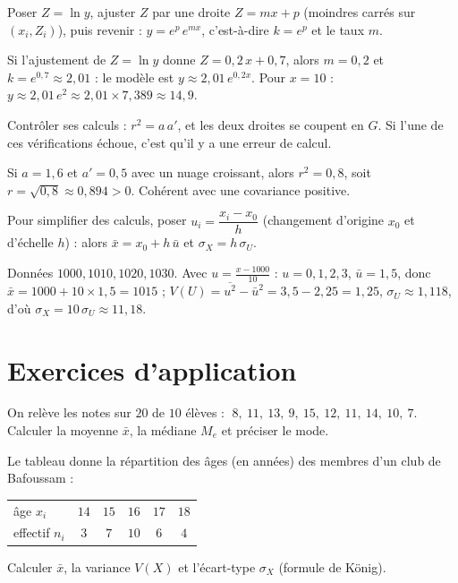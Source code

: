 Poser $Z=\ln y$, ajuster $Z$ par une droite $Z=mx+p$ (moindres carrés sur $(x_i,Z_i)$), puis
revenir : $y=e^{p}\,e^{mx}$, c'est-à-dire $k=e^{p}$ et le taux $m$.
\begin{exemple}
Si l'ajustement de $Z=\ln y$ donne $Z=0{,}2\,x+0{,}7$, alors $m=0{,}2$ et $k=e^{0{,}7}\approx2{,}01$ :
le modèle est $y\approx2{,}01\,e^{0{,}2x}$. Pour $x=10$ : $y\approx2{,}01\,e^{2}\approx2{,}01\times7{,}389\approx14{,}9$.
\end{exemple}

Contrôler ses calculs : $r^2=a\,a'$, et les deux droites se coupent en $G$. Si l'une de ces
vérifications échoue, c'est qu'il y a une erreur de calcul.
\begin{exemple}
Si $a=1{,}6$ et $a'=0{,}5$ avec un nuage croissant, alors $r^2=0{,}8$, soit $r=\sqrt{0{,}8}\approx0{,}894>0$.
Cohérent avec une covariance positive.
\end{exemple}

Pour simplifier des calculs, poser $u_i=\dfrac{x_i-x_0}{h}$ (changement d'origine $x_0$ et
d'échelle $h$) : alors $\bar x=x_0+h\,\bar u$ et $\sigma_X=h\,\sigma_U$.
\begin{exemple}
Données $1000,1010,1020,1030$. Avec $u=\frac{x-1000}{10}$ : $u=0,1,2,3$, $\bar u=1{,}5$,
donc $\bar x=1000+10\times1{,}5=1015$ ; $V(U)=\overline{u^2}-\bar u^2=3{,}5-2{,}25=1{,}25$,
$\sigma_U\approx1{,}118$, d'où $\sigma_X=10\,\sigma_U\approx11{,}18$.
\end{exemple}

\section{Exercices d'application}


\exo{} On relève les notes sur $20$ de $10$ élèves :
$\;8,\ 11,\ 13,\ 9,\ 15,\ 12,\ 11,\ 14,\ 10,\ 7$.
Calculer la moyenne $\bar x$, la médiane $M_e$ et préciser le mode.

\exo{} Le tableau donne la répartition des âges (en années) des membres d'un club
de Bafoussam :
\begin{center}\small
\begin{tabular}{@{}lccccc@{}}
\toprule
âge $x_i$ & $14$ & $15$ & $16$ & $17$ & $18$\\
effectif $n_i$ & $3$ & $7$ & $10$ & $6$ & $4$\\
\bottomrule
\end{tabular}
\end{center}
Calculer $\bar x$, la variance $V(X)$ et l'écart-type $\sigma_X$ (formule de König).

